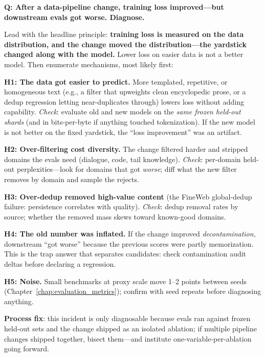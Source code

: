 \begin{interviewq}
\textbf{Q: After a data-pipeline change, training loss improved---but downstream evals got worse. Diagnose.}

 \quad {} \quad \badgefreq{\freqmed}

\stronganswer
Lead with the headline principle: \textbf{training loss is measured on the data distribution, and the change moved the distribution---the yardstick changed along with the model.} Lower loss on easier data is not a better model. Then enumerate mechanisms, most likely first:

\textbf{H1: The data got easier to predict.} More templated, repetitive, or homogeneous text (e.g., a filter that upweights clean encyclopedic prose, or a dedup regression letting near-duplicates through) lowers loss without adding capability. \textit{Check}: evaluate old and new models on the \textit{same frozen held-out shards} (and in bits-per-byte if anything touched tokenization). If the new model is not better on the fixed yardstick, the ``loss improvement'' was an artifact.

\textbf{H2: Over-filtering cost diversity.} The change filtered harder and stripped domains the evals need (dialogue, code, tail knowledge). \textit{Check}: per-domain held-out perplexities---look for domains that got \textit{worse}; diff what the new filter removes by domain and sample the rejects.

\textbf{H3: Over-dedup removed high-value content} (the FineWeb global-dedup failure: persistence correlates with quality). \textit{Check}: dedup removal rates by source; whether the removed mass skews toward known-good domains.

\textbf{H4: The old number was inflated.} If the change improved \textit{decontamination}, downstream ``got worse'' because the previous scores were partly memorization. This is the trap answer that separates candidates: check contamination audit deltas before declaring a regression.

\textbf{H5: Noise.} Small benchmarks at proxy scale move 1--2 points between seeds (Chapter~\ref{chap:evaluation_metrics}); confirm with seed repeats before diagnosing anything.

\textbf{Process fix}: this incident is only diagnosable because evals ran against frozen held-out sets and the change shipped as an isolated ablation; if multiple pipeline changes shipped together, bisect them---and institute one-variable-per-ablation going forward.


\end{interviewq}
